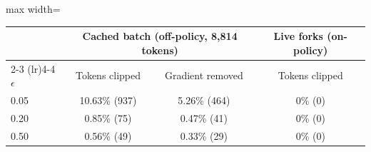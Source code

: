\begin{adjustbox}{max width=\linewidth}
\begin{tabular}{lccc}
\toprule
 & \multicolumn{2}{c}{Cached batch (off-policy, 8,814 tokens)} & Live forks (on-policy) \\
\cmidrule(lr){2-3} \cmidrule(lr){4-4}
$\epsilon$ & Tokens clipped & Gradient removed & Tokens clipped \\
\midrule
0.05 & 10.63\% (937) & 5.26\% (464) & 0\% (0) \\
0.20 & 0.85\% (75) & 0.47\% (41) & 0\% (0) \\
0.50 & 0.56\% (49) & 0.33\% (29) & 0\% (0) \\
\bottomrule
\end{tabular}
\end{adjustbox}
